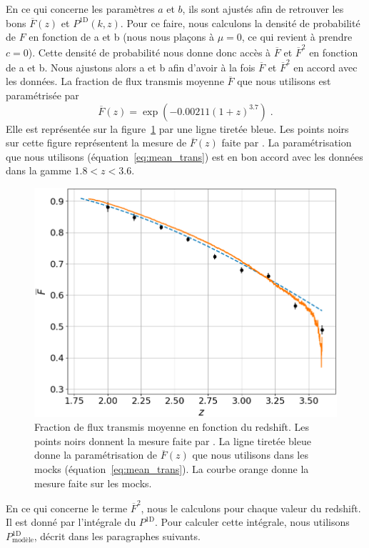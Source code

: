 En ce qui concerne les paramètres $a$ et $b$, ils sont ajustés afin de retrouver les bons $\overline F(z)$ et $P^{\mathrm{1D}}(k, z)$.
Pour ce faire, nous calculons la densité de probabilité de $F$ en fonction de a et b (nous nous plaçons à $\mu = 0$, ce qui revient à prendre $c = 0$).
Cette densité de probabilité nous donne donc accès à $\overline F$ et $\overline F^2$ en fonction de a et b. Nous ajustons alors a et b afin d'avoir à la fois $\overline F$ et $\overline F^2$ en accord avec les données. La fraction de flux transmis moyenne $\overline F$ que nous utilisons est paramétrisée par
\begin{equation}
  \label{eq:mean_trans}
  \overline F(z) = \exp(-0.00211 (1+z)^{3.7}) \;.
\end{equation}
Elle est représentée sur la figure~\ref{fig:mean_trans} par une ligne tiretée bleue. Les points noirs sur cette figure représentent la mesure de $\overline F(z)$  faite par \textcite{Faucher-Giguere2008}. La paramétrisation que nous utilisons (équation~\ref{eq:mean_trans}) est en bon accord avec les données dans la gamme $\num{1.8} < z < \num{3.6}$.
\begin{figure}
  \centering
  \includegraphics[scale=0.4]{mean_trans_all}
  \caption{Fraction de flux transmis moyenne en fonction du redshift. Les points noirs donnent la mesure faite par \textcite{Faucher-Giguere2008}. La ligne tiretée bleue donne la paramétrisation de $\overline F(z)$ que nous utilisons dans les mocks (équation~\ref{eq:mean_trans}). La courbe orange donne la mesure faite sur les mocks.}
  \label{fig:mean_trans}
\end{figure}
En ce qui concerne le terme $\overline F^2$, nous le calculons pour chaque valeur du redshift. Il est donné par l'intégrale du $P^{\mathrm{1D}}$. Pour calculer cette intégrale, nous utilisons $P^{\mathrm{1D}}_{\mathrm{modèle}}$, décrit dans les paragraphes suivants.



